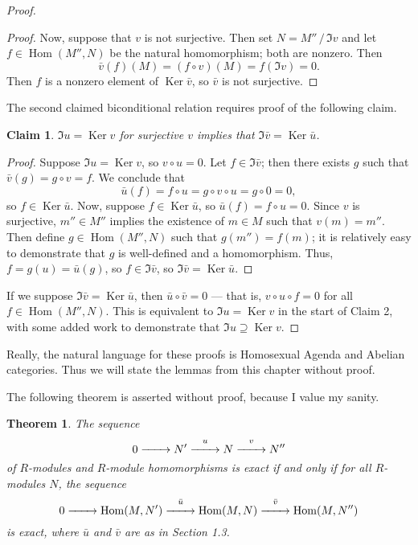 \documentclass[11pt]{article}
\newtheorem{theorem}{Theorem}
\newtheorem{claim}{Claim}
\newcommand{\Hom}{\operatorname{Hom}}
\newcommand{\Ker}{\operatorname{Ker}}
\renewcommand{\longrightarrow}{\xrightarrow{\hspace*{0.7cm}}}
\begin{document}
\begin{adjustwidth}{1cm}{}
\begin{proof}
\begin{adjustwidth}{1cm}{}
\begin{proof}
				Now, suppose that $v$ is not surjective. Then set $N = M'' \,/\, \Im v$ and let $f \in \Hom(M'', N)$ be the natural homomorphism; both are nonzero. Then
				\[
					\bar{v}(f)(M) = (f \circ v)(M) = f(\Im v) = 0.
				\]
				Then $f$ is a nonzero element of $\Ker \bar{v}$, so $\bar{v}$ is not surjective.
			\end{proof}
		\end{adjustwidth}
		The second claimed biconditional relation requires proof of the following claim.
		\begin{adjustwidth}{1cm}{}
			\begin{claim}
				$\Im u = \Ker v$ for surjective $v$ implies that $\Im \bar{v} = \Ker \bar{u}$.
			\end{claim}
			\begin{proof}\renewcommand{\qedsymbol}{}
				Suppose $\Im u = \Ker v$, so $v \circ u = 0$. Let $f \in \Im \bar{v}$; then there exists $g$ such that $\bar{v}(g) = g \circ v = f$. We conclude that
				\[
					\bar{u}(f) = f \circ u = g \circ v \circ u = g \circ 0 = 0,
				\]
				so $f \in \Ker \bar{u}$. Now, suppose $f \in \Ker \bar{u}$, so $\bar{u}(f) = f \circ u = 0$. Since $v$ is surjective, $m'' \in M''$ implies the existence of $m \in M$ such that $v(m) = m''$. Then define $g \in \Hom(M'', N)$ such that $g(m'') = f(m)$; it is relatively easy to demonstrate that $g$ is well-defined and a homomorphism. Thus, $f = g(u) = \bar{u}(g)$, so $f \in \Im \bar{v}$, so $\Im \bar{v} = \Ker \bar{u}$.
			\end{proof}
		\end{adjustwidth}
		If we suppose $\Im \bar{v} = \Ker \bar{u}$, then $\bar{u} \circ \bar{v} = 0$ --- that is, $v \circ u \circ f = 0$ for all $f \in \Hom(M'', N)$. This is equivalent to $\Im u = \Ker v$ in the start of Claim 2, with some added work to demonstrate that $\Im u \supseteq \Ker v$.
	\end{proof}
\end{adjustwidth}

Really, the natural language for these proofs is Homosexual Agenda and Abelian categories. Thus we will state the lemmas from this chapter without proof.

\newpage

The following theorem is asserted without proof, because I value my sanity.

\begin{adjustwidth}{1cm}{}
  \begin{theorem}
		The sequence
		\[
			0 \longrightarrow N' \stackrel{u}{\longrightarrow} N \stackrel{v}{\longrightarrow} N''
    \]
		of $R$-modules and $R$-module homomorphisms is exact if and only if for all $R$-modules $N$, the sequence
		\[
			0 \longrightarrow \Hom(M, N') \stackrel{\bar{u}}{\longrightarrow} \Hom(M, N) \stackrel{\bar{v}}{\longrightarrow} \Hom(M, N'')
    \]
		is exact, where $\bar{u}$ and $\bar{v}$ are as in Section 1.3.
  \end{theorem}
\end{adjustwidth}
\end{document}
